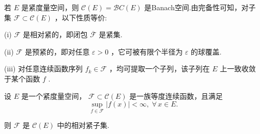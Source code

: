 若 $E$ 是紧度量空间，则 $\mathcal{C}\left( E\right)  = \mathcal{B}C\left( E\right)$ 是Banach空间.由完备性可知，对子集 $\mathcal{F} \subset  \mathcal{C}\left( E\right)$ ，以下性质等价:

(i) $\mathcal{F}$ 是相对紧的，即闭包 $\overline{\mathcal{F}}$ 是紧集.

(ii) $\mathcal{F}$ 是预紧的，即对任意 $\varepsilon  > 0$ ，它可被有限个半径为 $\varepsilon$ 的球覆盖.

(iii) 对任意连续函数序列 ${f}_{k} \in  \mathcal{F}$ ，均可提取一个子列，该子列在 $E$ 上一致收敛于某个函数 $f$ .

\begin{theorem}[Ascoli 定理]\label{thm:ascoli}
设 $E$ 是一个紧度量空间， $\mathcal{F} \subset  \mathcal{C}\left( E\right)$ 是一族等度连续函数，且满足
\begin{equation}\tag{3.11}\label{eq:ascoli-pointwise-bounded}
    \sup_{{f \in  \mathcal{F}}}\left| {f\left( x\right) }\right|  < \infty, \;\forall\,x \in  E.
\end{equation}

则 $\mathcal{F}$ 是 $\mathcal{C}\left( E\right)$ 中的相对紧子集.
\end{theorem}

